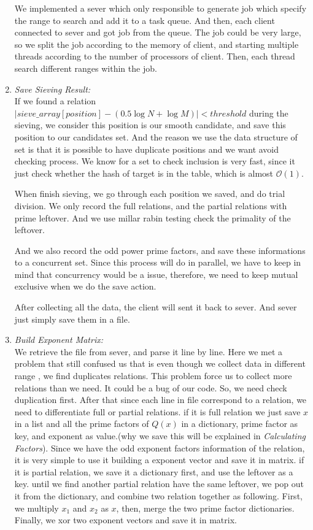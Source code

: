 \documentclass[12pt]{article} %
\newcommand{\itemgap}[1][2]{\vspace{#1mm}}
\begin{document}
\begin{enumerate}
We implemented a sever which only responsible to generate job which specify the range to search and add it to a task queue. And then, each client connected to sever and got job from the queue. The job could be very large, so we split the job according to the memory of client, and starting multiple threads according to the number of processors of client. Then, each thread search different ranges within the job.

\item \textit{Save Sieving Result:} \itemgap
\\ If we found a relation $\left|sieve\_array[position]-(0.5\log{N}+\log{M})\right| < threshold$ during the sieving, we consider this position is our smooth candidate, and save this position to our candidates set. And the reason we use the data structure of set is that it is possible to have duplicate positions and we want avoid checking process. We know for a set to check inclusion is very fast, since it just check whether the hash of target is in the table, which is almost $\mathcal{O}(1)$. 

When finish sieving, we go through each position we saved, and do trial division. We  only record the full relations, and the partial relations with prime leftover. And we use millar rabin testing check the primality of the leftover. 

And we also record the odd power prime factors, and save these informations to a concurrent set. Since this process will do in parallel, we have to keep in mind that concurrency would be a issue, therefore, we need to keep mutual exclusive when we do the save action. 

After collecting all the data, the client will sent it back to sever. And sever just simply save them in a file.

\item \textit{Build Exponent Matrix:} \itemgap
\\ We retrieve the file from sever, and parse it line by line. Here we met a problem that still confused us that is even though we collect data in different range , we find duplicates relations. This problem force us to collect more relations than we need. It could be a bug of our code. So, we need check duplication first.
After that since each line in file correspond to a relation, we need to differentiate full or partial relations. if it is full relation we just save $x$ in a list and all the prime factors of $Q(x)$ in a dictionary, prime factor as key, and exponent as value.(why we save this will be explained in \textit{Calculating Factors}). Since we have the odd exponent factors information of the relation, it is very simple to use it building a exponent vector and save it in matrix. if it is partial relation, we save it a dictionary first, and use the leftover as a key. until we find another partial relation have the same leftover, we pop out it from the dictionary, and combine two relation together as following. First, we multiply $x_1$ and $x_2$ as $x$, then, merge the two prime factor dictionaries. Finally, we xor two exponent vectors and save it in matrix.


\end{enumerate}
\end{document}
